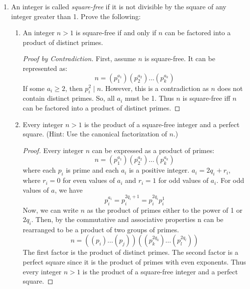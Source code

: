 \documentclass[11pt]{article}
\begin{document}
\begin{enumerate}
    \item An integer is called \emph{square-free} if it is not divisible by the square
    of any integer greater than 1. Prove the following:
        \begin{enumerate}
            \item An integer $n>1$ is square-free if and only if $n$ can be factored into a
            product of distinct primes.
            \begin{proof} [Proof by Contradiction]
                First, assume $n$ is square-free. It can be represented as:
                \[
                    n = (p_1^{a_1})(p_2^{a_2})\dots(p_k^{a_k})
                \]
                If some $a_i\ge 2$, then $p_i^2\mid n$. 
                However, this is a contradiction as $n$ does not contain distinct primes. 
                So, all $a_i$ must be 1.
                Thus $n$ is square-free iff $n$ can be factored into a product of distinct primes.
            \end{proof}

            \item Every integer $n>1$ is the product of a square-free integer and a perfect
            square. (Hint: Use the canonical factorization of $n$.)
            \begin{proof} 
                Every integer $n$ can be expressed as a product of primes:
                \[
                    n = (p_1^{a_1})(p_2^{a_2})\dots(p_k^{a_k})
                \]
                where each $p_i$ is prime and each $a_i$ is a positive integer.
                $a_i=2q_i+r_i$, where $r_i=0$ for even values of $a_i$ and $r_i=1$ for odd values of
                $a_i$. For odd values of $a$, we have
                \[
                    p_i^{a_i} = p_i^{2q_i+1} = p_i^{2q_i}p_i^1        
                \]
                Now, we can write $n$ as the product of primes either to 
                the power of 1 or $2q_i$. Then, by the commutative and associative 
                properties n can be rearranged to be a product of two groups of 
                primes.
                \[
                    n = ((p_i)\dots(p_j))((p_k^{2q_k})\dots(p_l^{2q_l}))
                \]
                The first factor is the product of distinct primes. The second factor
                is a perfect square since it is the product of primes with even exponents. 
                Thus every integer $n>1$ is the product of a square-free integer and a 
                perfect square.

            \end{proof}
        \end{enumerate}


\end{enumerate}
\end{document}
